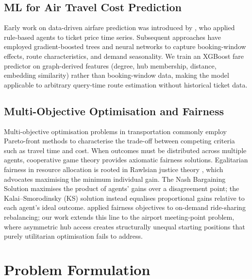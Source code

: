 \documentclass[review]{elsarticle}
\begin{document}
\subsection{ML for Air Travel Cost Prediction}

Early work on data-driven airfare prediction was introduced by \citeauthor{etzioni2003} \cite{etzioni2003}, who applied rule-based agents to ticket price time series.
Subsequent approaches have employed gradient-boosted trees \cite{friedman2001} and neural networks to capture booking-window effects, route characteristics, and demand seasonality.
We train an XGBoost \cite{chen2016} fare predictor on graph-derived features (degree, hub membership, distance, embedding similarity) rather than booking-window data, making the model applicable to arbitrary query-time route estimation without historical ticket data.

\subsection{Multi-Objective Optimisation and Fairness}

Multi-objective optimisation problems in transportation commonly employ Pareto-front methods \cite{deb2002} to characterise the trade-off between competing criteria such as travel time and cost.
When outcomes must be distributed across multiple agents, cooperative game theory provides axiomatic fairness solutions.
Egalitarian fairness in resource allocation is rooted in Rawlsian justice theory \cite{rawls1971}, which advocates maximising the minimum individual gain.
The Nash Bargaining Solution \cite{nash1950} maximises the product of agents' gains over a disagreement point; the Kalai--Smorodinsky (KS) solution \cite{kalai1975} instead equalises proportional gains relative to each agent's ideal outcome.
\citeauthor{lesmana2019} \cite{lesmana2019} applied fairness objectives to on-demand ride-sharing rebalancing; our work extends this line to the airport meeting-point problem, where asymmetric hub access creates structurally unequal starting positions that purely utilitarian optimisation fails to address.

\section{Problem Formulation}
\end{document}

